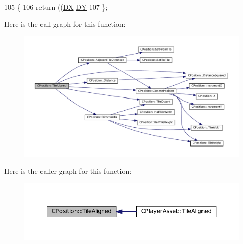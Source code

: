 \begin{DoxyCode}
105                                 \{
106             \textcolor{keywordflow}{return} ((\hyperlink{classCPosition_a28445f9b872169715919074d82044eda}{DX} %
      \hyperlink{classCPosition_a84139c9e8eb547e7cf3cb851739943a4}{DY} %
107         \};
\end{DoxyCode}
Here is the call graph for this function\+:\nopagebreak
\begin{figure}[H]
\begin{center}
\leavevmode
\includegraphics[width=350pt]{classCPosition_abe4ef039d9bbf51cd542167b5a0cd88e_cgraph}
\end{center}
\end{figure}
Here is the caller graph for this function\+:\nopagebreak
\begin{figure}[H]
\begin{center}
\leavevmode
\includegraphics[width=350pt]{classCPosition_abe4ef039d9bbf51cd542167b5a0cd88e_icgraph}
\end{center}
\end{figure}
\hypertarget{classCPosition_ac4f0edd9c9632f1bdca981ef5d9b71e5}{}\label{classCPosition_ac4f0edd9c9632f1bdca981ef5d9b71e5} 
